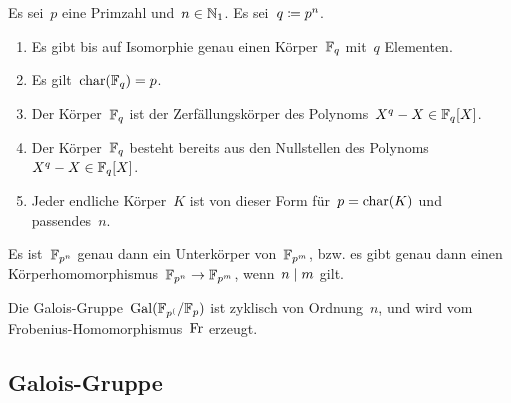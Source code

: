 \begin{theorem}
  Es sei~$p$ eine Primzahl und~$n \in \mathbb{N}_1$.
  Es sei~$q \coloneqq p^n$.
  \begin{enumerate}
    \item
      Es gibt bis auf Isomorphie genau einen Körper~$\mathbb{F}_q$ mit~$q$ Elementen.
    \item
      Es gilt~$\operatorname{char}(\mathbb{F}_q) = p$.
    \item
      Der Körper~$\mathbb{F}_q$ ist der Zerfällungskörper des Polynoms~$X^q - X \in \mathbb{F}_q[X]$.
    \item
      Der Körper~$\mathbb{F}_q$ besteht bereits aus den Nullstellen des Polynoms~$X^q - X \in \mathbb{F}_q[X]$.
    \item
      Jeder endliche Körper~$K$ ist von dieser Form für~$p = \operatorname{char}(K)$ und passendes~$n$.
  \end{enumerate}
\end{theorem}

\begin{proposition}
  Es ist~$\mathbb{F}_{p^n}$ genau dann ein Unterkörper von~$\mathbb{F}_{p^m}$, bzw. es gibt genau dann einen Körperhomomorphismus~$\Finite_{p^n} \to \Finite_{p^m}$, wenn~$n \mid m$ gilt.
\end{proposition}

\begin{proposition}
  Die Galois-Gruppe~$\operatorname{Gal}(\mathbb{F}_{p^(} / \mathbb{F}_p)$ ist zyklisch von Ordnung~$n$, und wird vom Frobenius-Homomorphismus~$\operatorname{Fr}$ erzeugt.
\end{proposition}


\subsection{Galois-Gruppe}




